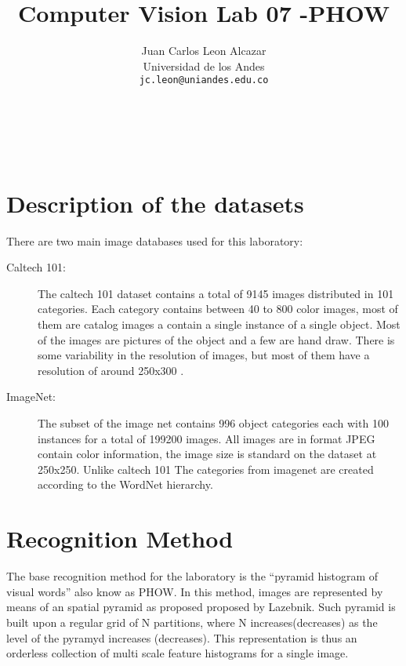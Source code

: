 \documentclass[10pt,twocolumn,letterpaper]{article}
\begin{document}
\title{Computer Vision Lab 07 -PHOW }

\author{Juan Carlos Leon Alcazar\\
Universidad de los Andes\\
{\tt\small jc.leon@uniandes.edu.co}
\and
\\
\\
\\
{\tt\small }
}

\maketitle


\section{Description of the datasets}
There are two main image databases used for this laboratory:

\begin{description}
\item[Caltech 101:] The caltech 101 dataset contains a total of 9145 images distributed in 101 categories. Each category contains between 40 to 800 color images, most of them are catalog images a contain a single instance of a single object. Most of the images are pictures of the object and a few are hand draw.  There is some variability in the resolution of images, but most of them have a resolution of around 250x300 \cite{Fei-Fei2007}.

\item[ImageNet:] The subset of the image net contains 996 object categories each with 100 instances for a total of 199200 images. All images are in format JPEG contain color information, the image size is standard on the dataset at 250x250. Unlike caltech 101 The categories from imagenet are created according to the  WordNet hierarchy.\cite{Deng2009}
\end{description}


\section{Recognition Method}

The base recognition method for the laboratory is the “pyramid histogram of visual words” also know as PHOW\cite{Bosch2007}. In this method, images are represented by means of an spatial pyramid as proposed proposed by Lazebnik\cite{Lazebnik2006}. Such pyramid  is built upon a regular grid of  N  partitions, where N increases(decreases) as the level of the pyramyd increases (decreases). This representation is thus an orderless collection of multi scale feature histograms for a single image.
\end{document}
